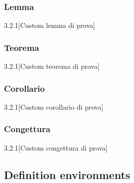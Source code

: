 \subsubsection{Lemma}

\begin{lemma}
\lipsum[4]
\end{lemma}

\begin{lemma-num}{3.2.1}[Custom lemma di prova]
\lipsum[4]
\end{lemma-num}

\subsubsection{Teorema}

\begin{teorema}
\lipsum[4]
\end{teorema}

\begin{teorema-num}{3.2.1}[Custom teorema di prova]
\lipsum[4]
\end{teorema-num}

\subsubsection{Corollario}

\begin{corollario}
\lipsum[4]
\end{corollario}

\begin{corollario-num}{3.2.1}[Custom corollario di prova]
\lipsum[4]
\end{corollario-num}
 
\subsubsection{Congettura}

\begin{congettura}
\lipsum[4]
\end{congettura}

\begin{congettura-num}{3.2.1}[Custom congettura di prova]
\lipsum[4]
\end{congettura-num}

\subsection{Definition environments} 


